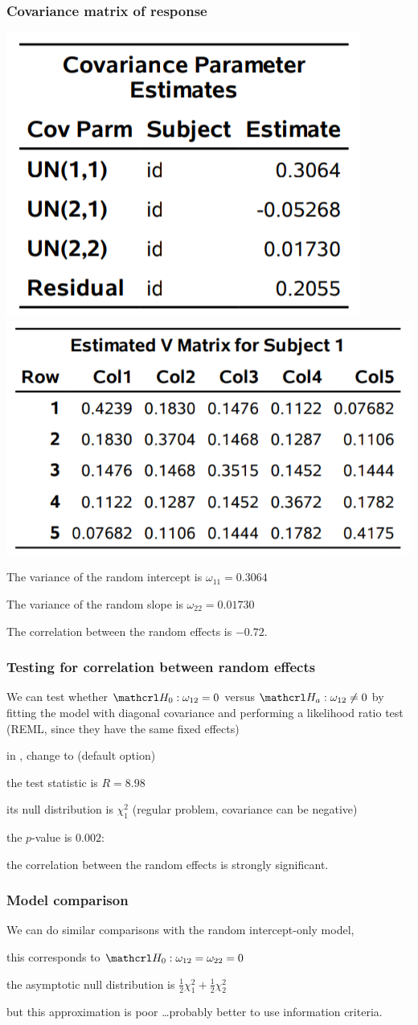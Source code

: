 \documentclass{beamer}
\begin{document}
\begin{frame}
 \frametitle{Covariance matrix of response}
 \begin{center}
\includegraphics[width = 0.4\linewidth]{img/c6/slides7-e25}
\includegraphics[width = 0.55\linewidth]{img/c6/slides7-e24}
\end{center}
\bi \item 
The variance of the random intercept is $\omega_{11}=0.3064$
\item The variance of the random slope is $\omega_{22}=0.01730$
\item The correlation between the random effects is $-0.72$.
\ei
\end{frame}
\begin{frame}
\frametitle{Testing for correlation between random effects}
\bi
\item We can test whether $\Hy_0: \omega_{12}=0$ versus $\Hy_a: \omega_{12} \neq 0$ by fitting the model with diagonal covariance and performing a likelihood ratio test (REML, since they have the same fixed effects) 
\bi
\item in \SASlang{}, change  to  (default option)
\item the test statistic is $R=8.98$ 
\item its null distribution is $\chi^2_1$ (regular problem, covariance can be negative)
\item the $p$-value is $0.002$:
\item the correlation between the random effects is strongly significant. \ei
\ei
\end{frame}
\begin{frame}
\frametitle{Model comparison}
\bi \item 
 We can do similar comparisons with the random intercept-only model,
 \bi \item this corresponds to $\Hy_0: \omega_{12} =\omega_{22}=0$
 \item the asymptotic null distribution is $\frac{1}{2} \chi^2_1 + \frac{1}{2} \chi^2_2$ \item but this approximation is poor \ldots probably better to use information criteria.
 \ei
 \ei
\end{frame}
\end{document}
